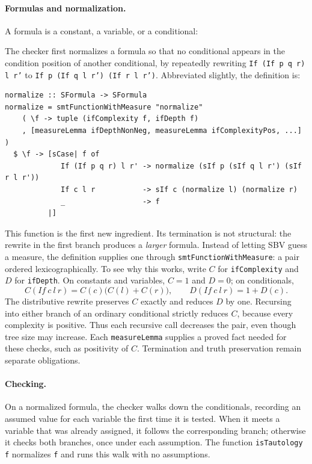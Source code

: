 \documentclass[acmsmall,screen,review,anonymous,nonacm]{acmart}
\newcommand{\code}[1]{\texttt{#1}}
\newcommand{\libsnippet}[1]{\par\noindent
  \begin{minipage}{\linewidth}
  
  \end{minipage}\par}
\begin{document}
\paragraph{Formulas and normalization.}
A formula is a constant, a variable, or a conditional:
\libsnippet{tautFormula}
The checker first normalizes a formula so that no conditional appears in the
condition position of another conditional, by repeatedly rewriting
\code{If (If p q r) l r'} to \code{If p (If q l r') (If r l r')}. Abbreviated
slightly, the definition is:
\begin{lstlisting}
normalize :: SFormula -> SFormula
normalize = smtFunctionWithMeasure "normalize"
    ( \f -> tuple (ifComplexity f, ifDepth f)
    , [measureLemma ifDepthNonNeg, measureLemma ifComplexityPos, ...] )
  $ \f -> [sCase| f of
             If (If p q r) l r' -> normalize (sIf p (sIf q l r') (sIf r l r'))
             If c l r           -> sIf c (normalize l) (normalize r)
             _                  -> f
          |]
\end{lstlisting}
This function is the first new ingredient. Its termination is not structural:
the rewrite in the first branch produces a \emph{larger} formula. Instead of
letting SBV guess a measure, the definition supplies one through
\code{smtFunctionWithMeasure}: a pair
ordered lexicographically. To see why this works, write $C$ for
\code{ifComplexity} and $D$ for \code{ifDepth}. On constants and variables,
$C=1$ and $D=0$; on conditionals,
\[
 C(\mathit{If}\ c\ l\ r)=C(c)\bigl(C(l)+C(r)\bigr),
 \qquad D(\mathit{If}\ c\ l\ r)=1+D(c).
\]
The distributive rewrite preserves $C$ exactly and reduces $D$ by one.
Recursing into either branch of an ordinary conditional strictly reduces $C$,
because every complexity is positive. Thus each recursive call decreases the
pair, even though tree size may increase. Each \code{measureLemma} supplies a
proved fact needed for these checks, such as positivity of $C$. Termination and
truth preservation remain separate obligations.

\paragraph{Checking.}
On a normalized formula, the checker walks down the conditionals, recording an
assumed value for each variable the first time it is tested. When it meets a
variable that was already assigned, it follows the corresponding branch;
otherwise it checks both branches, once under each assumption. The function
\code{isTautology f} normalizes \code{f} and runs this walk with no assumptions.
\end{document}
